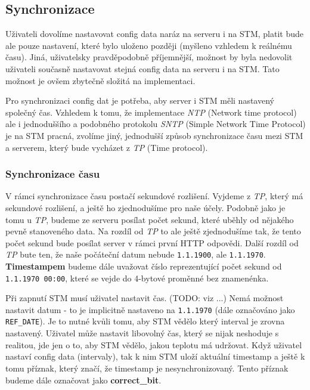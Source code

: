 \subsection{Synchronizace}

Uživateli dovolíme nastavovat config data naráz na serveru i na STM, platit bude ale pouze
nastavení, které bylo uloženo později (myšleno vzhledem k reálnému času).
Jiná, uživatelsky pravděpodobně příjemnější, možnost by byla nedovolit uživateli současně
nastavovat stejná config data na serveru i na STM.
Tato možnost je ovšem zbytečně složitá na implementaci.

Pro synchronizaci config dat je potřeba, aby server i STM měli nastavený společný čas.
Vzhledem k tomu, že implementace \emph{NTP} (Network time protocol) ale i jednoduššího a podobného
protokolu \emph{SNTP} (Simple Network Time Protocol) je na STM pracná, zvolíme jiný, jednodušší způsob synchronizace
času mezi STM a serverem, který bude vycházet z \emph{TP} (Time protocol).

\subsubsection{Synchronizace času}
V rámci synchronizace času postačí sekundové rozlišení.
Vyjdeme z \emph{TP}, který má sekundové rozlišení, a ještě ho zjednodušíme pro naše účely.
Podobně jako je tomu u \emph{TP}, budeme ze serveru posílat počet sekund, které
uběhly od nějakého pevně stanoveného data.
Na rozdíl od \emph{TP} to ale ještě zjednodušíme tak, že tento počet sekund bude posílat server
v rámci první HTTP odpovědi.
Další rozdíl od \emph{TP} bute ten, že naše počáteční datum nebude \texttt{1.1.1900}, ale \texttt{1.1.1970}.
\textbf{Timestampem} budeme dále uvažovat číslo reprezentující počet sekund od \texttt{1.1.1970 00:00},
které se vejde do 4-bytové proměnné bez znamenénka.

Při zapnutí STM musí uživatel nastavit čas. (TODO: viz ...)
Nemá možnost nastavit datum - to je implicitně nastaveno na \texttt{1.1.1970} (dále označováno jako \texttt{REF\_DATE}).
Je to nutné kvůli tomu, aby STM vědělo který interval je zrovna nastavený.
Uživatel může nastavit libovolný čas, který se nijak neshoduje s realitou, jde jen o to,
aby STM vědělo, jakou teplotu má udržovat.
Když uživatel nastaví config data (intervaly), tak k nim STM uloží aktuální timestamp
a ještě k tomu příznak, který značí, že timestamp je nesynchronizovaný.
Tento příznak budeme dále označovat jako \textbf{correct\_bit}.

